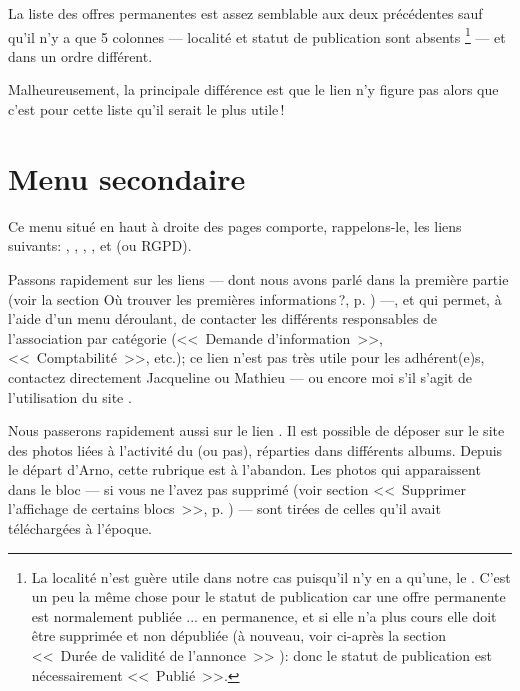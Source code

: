 
La liste des offres permanentes est assez semblable aux deux précédentes sauf qu’il n’y a que 5 colonnes --- localité et statut de publication sont absents%
\footnote{La localité n'est guère utile dans notre cas puisqu'il n'y en a qu'une, le \CdS. C'est un peu la même chose pour le statut de publication car une offre permanente est normalement publiée ... en permanence, et si elle n'a plus cours elle doit être supprimée et non dépubliée (à nouveau, voir ci-après la section <<~Durée de validité de l'annonce~>> ): donc le statut de publication est nécessairement <<~Publié~>>.}
--- et dans un ordre  différent.

Malheureusement, la principale différence est que le lien  n'y figure pas alors que c’est pour cette liste qu’il serait le plus utile\,!

\section{Menu secondaire}

Ce menu situé en haut à droite des pages comporte, rappelons-le, les liens suivants: , , , , et  (ou RGPD).

Passons rapidement sur les liens  --- dont nous avons parlé dans la première partie (voir la section \og{}Où trouver les premières informations\,?\fg, p. \pageref{page:premieresInfos}) ---, et  qui permet, à l'aide d'un menu déroulant, de contacter les différents responsables de l'association par catégorie (<<~Demande d'information~>>, <<~Comptabilité~>>, etc.); ce lien n’est pas très utile pour les adhérent(e)s, contactez directement Jacqueline ou Mathieu
 --- ou encore moi s'il s'agit de l'utilisation du site \CF.

Nous passerons rapidement aussi sur le lien . Il est possible de déposer sur le site des photos liées à l’activité du \sel{} (ou pas), réparties dans différents albums. Depuis le départ d’Arno, cette rubrique est à l’abandon. Les photos qui apparaissent dans le bloc  --- si vous ne l’avez pas supprimé (voir section <<~Supprimer l'affichage de certains blocs~>>, p. \pageref{sec:supprimerBlocs}) --- sont tirées de celles qu’il avait téléchargées à l’époque.

